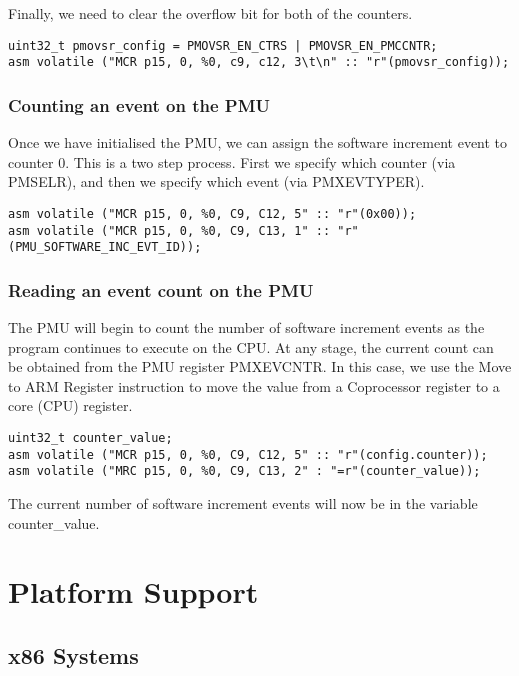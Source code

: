 {Finally, we need to clear the overflow bit for both of the counters.

\lstset{language=C}
\begin{lstlisting}
uint32_t pmovsr_config = PMOVSR_EN_CTRS | PMOVSR_EN_PMCCNTR;
asm volatile ("MCR p15, 0, %0, c9, c12, 3\t\n" :: "r"(pmovsr_config));
\end{lstlisting}

\subsubsection{Counting an event on the PMU}

Once we have initialised the PMU, we can assign the software increment event to counter 0. This is a two step process. First we specify which counter (via PMSELR), and then we specify which event (via PMXEVTYPER).

\lstset{language=C}
\begin{lstlisting}
asm volatile ("MCR p15, 0, %0, C9, C12, 5" :: "r"(0x00));
asm volatile ("MCR p15, 0, %0, C9, C13, 1" :: "r"(PMU_SOFTWARE_INC_EVT_ID));
\end{lstlisting}

\subsubsection{Reading an event count on the PMU}

The PMU will begin to count the number of software increment events as the program continues to execute on the CPU. At any stage, the current count can be obtained from the PMU register PMXEVCNTR. In this case, we use the Move to ARM Register \cite{DocsArmMRC} instruction to move the value from a Coprocessor register to a core (CPU) register.

\lstset{language=C}
\begin{lstlisting}
uint32_t counter_value;
asm volatile ("MCR p15, 0, %0, C9, C12, 5" :: "r"(config.counter));
asm volatile ("MRC p15, 0, %0, C9, C13, 2" : "=r"(counter_value));
\end{lstlisting}

The current number of software increment events will now be in the variable counter\_value.


\section{Platform Support}

\subsection{x86 Systems}

}
